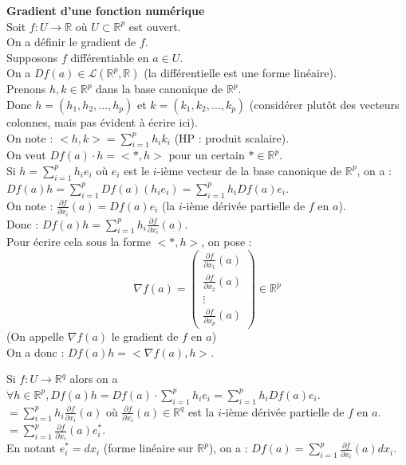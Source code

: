 \documentclass{article}
\begin{document}
\textbf{Gradient d'une fonction numérique}\\
Soit $f \colon U \to \mathbb{R}$ où $U \subset \mathbb{R}^p$ est ouvert.\\
On a définir le gradient de $f$.\\
Supposons $f$ différentiable en $a \in U$.\\
On a $Df(a) \in \mathcal{L}(\mathbb{R}^p, \mathbb{R})$ (la différentielle est une forme linéaire).\\
Prenons $h,k \in \mathbb{R}^p$ dans la base canonique de $\mathbb{R}^p$.\\
Donc $h = (h_1, h_2, \ldots, h_p)$ et $k = (k_1, k_2, \ldots, k_p)$ (considérer plutôt des vecteurs colonnes, mais pas évident à écrire ici).\\
On note : $< h, k > = \sum_{i=1}^p h_i k_i$ (HP : produit scalaire).\\
On veut $Df(a) \cdot h = < *, h>$ pour un certain $* \in \mathbb{R}^p$.\\
Si $h = \sum_{i=1}^p h_i e_i$ où $e_i$ est le $i$-ième vecteur de la base canonique de $\mathbb{R}^p$, on a :\\
$Df(a)h = \sum_{i=1}^p Df(a) (h_i e_i) = \sum_{i=1}^p h_i Df(a)e_i$.\\
On note : $\frac{\partial f}{\partial x_i}(a) = Df(a)e_i$ (la $i$-ième dérivée partielle de $f$ en $a$).\\
Donc : $Df(a)h = \sum_{i=1}^p h_i \frac{\partial f}{\partial x_i}(a)$.\\
Pour écrire cela sous la forme $< *, h>$, on pose :
\[
    \nabla f(a) = \begin{pmatrix}
        \frac{\partial f}{\partial x_1}(a) \\
        \frac{\partial f}{\partial x_2}(a) \\
        \vdots \\
        \frac{\partial f}{\partial x_p}(a)
    \end{pmatrix} \in \mathbb{R}^p
\]
(On appelle $\nabla f(a)$ le gradient de $f$ en $a$)\\
On a donc : $Df(a)h = < \nabla f(a), h >$.


Si $f : U \to \mathbb{R}^q$ alors on a $\forall h \in \mathbb{R}^p, Df(a)h  = Df(a) \cdot \sum_{i=1}^p h_i e_i = \sum_{i=1}^p h_i Df(a)e_i$.\\
$= \sum_{i=1}^p h_i \frac{\partial f}{\partial x_i}(a)$ où $\frac{\partial f}{\partial x_i}(a) \in \mathbb{R}^q$ est la $i$-ième dérivée partielle de $f$ en $a$.\\
$= \sum_{i=1}^p \frac{\partial f}{\partial x_i}(a) e_i^*$.\\
En notant $e_i^* = dx_i$ (forme linéaire sur $\mathbb{R}^p$), on a : $Df(a) = \sum_{i=1}^p \frac{\partial f}{\partial x_i}(a) dx_i$.\\
\end{document}
